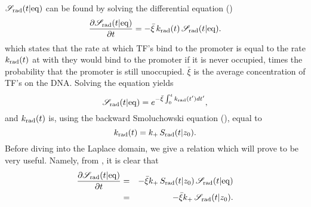 $\mathscr{S}_{\rm rad}(t|{\rm eq})$ can be found by solving the differential equation ()
\begin{equation}
 \pdiff{\mathscr{S}_{\rm rad}(t|{\rm eq})}{t} = - \bar{\xi} \, k_{\rm rad}(t) \, \mathscr{S}_{\rm rad}(t|{\rm eq}).
 \elabel{DE_Seq}
\end{equation}
which states that the rate at which TF's bind to the promoter is equal to the rate $k_{{\rm rad}}(t)$ at with they would bind to the promoter if it is never occupied, times the probability that the promoter is still unoccupied. $\bar{\xi}$ is the average concentration of TF's on the DNA. Solving the equation yields
\begin{equation}
 \mathscr{S}_{\rm rad}(t|{\rm eq}) = e^{-\bar{\xi}\int_0^t k_{{\rm rad}}(t') dt'},
 \elabel{Seq}
\end{equation}
and $k_{{\rm rad}}(t)$ is, using the backward Smoluchowski equation (), equal to 
\begin{equation}
 k_{\rm rad}(t) = k_+ \, S_{\rm rad}(t|z_0).
 \elabel{krad}
\end{equation}
Before diving into the Laplace domain, we give a relation which will prove to be very useful. Namely, from , it is clear that
\begin{eqnarray}
 \pdiff{\mathscr{S}_{\rm rad}(t|{\rm eq})}{t} & = & -\bar{\xi} k_+ \, S_{\rm rad}(t|z_0) \, \mathscr{S}_{\rm rad}(t|{\rm eq}) \\
 & = & -\bar{\xi} k_+ \, \mathscr{S}_{\rm rad}(t|z_0).
 \elabel{SeqSsi}
\end{eqnarray}

